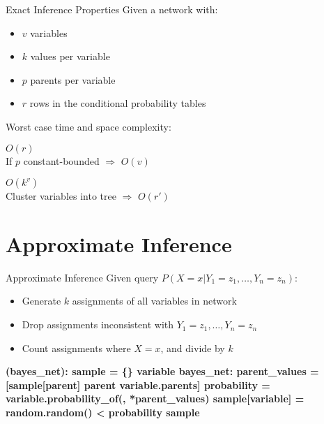 \documentclass[14pt]{beamer}
\begin{document}
\begin{frame}{Exact Inference Properties}
Given a network with:
\begin{itemize}
\item $v$ variables
\item $k$ values per variable
\item $p$ parents per variable
\item $r$ rows in the conditional probability tables
\end{itemize}
Worst case time and space complexity:
\begin{description}
\item[Singly connected]
$O(r)$ \\
\pause
If $p$ constant-bounded $\Rightarrow$ $O(v)$
\pause
\item[Multiply connected]
$O(k^{v})$ \\
\pause
Cluster variables into tree $\Rightarrow$ $O(r')$
\end{description}
\end{frame}


\section{Approximate Inference}
\begin{frame}[fragile]{Approximate Inference}
Given query $P(X=x|Y_1=z_1,\ldots,Y_n=z_n)$:
\begin{itemize}
\item Generate $k$ assignments of all variables in network
\item Drop assignments inconsistent with {\small$Y_1=z_1,\ldots,Y_n=z_n$}
\item Count assignments where $X\!=\!x$, and divide by $k$
\end{itemize}
\pause
\begin{semiverbatim}\scriptsize\bfseries
{} (bayes_net):
    \pause{}
    sample = \{\}
     variable  bayes_net:
        \pause{}
        parent_values = [sample[parent]  parent  variable.parents]
        \pause{}
        probability = variable.probability_of(, *parent_values)
        \pause{}
        sample[variable] = random.random() < probability
    \pause{}
     sample
\end{semiverbatim}
\end{frame}
\end{document}
